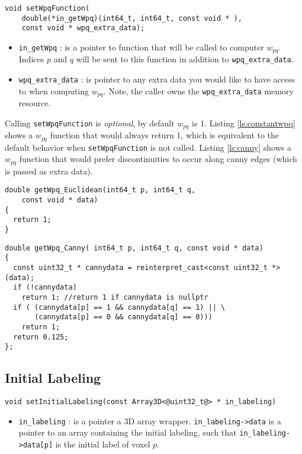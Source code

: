 \documentclass[12pt,letterpaper]{article}
\begin{document}
\begin{lstlisting}
void setWpqFunction(
    double(*in_getWpq)(int64_t, int64_t, const void * ),
    const void * wpq_extra_data);
\end{lstlisting}
\begin{itemize}
\item \lstinline{in_getWpq} : is a pointer to function that will be called to computer $w_{pq}$. Indices $p$ and $q$ will be sent to this function in addition to \lstinline{wpq_extra_data}.
\item \lstinline{wpq_extra_data} : is pointer to any extra data you would like to have access to when computing $w_{pq}.$ Note, the caller owns the \lstinline{wpq_extra_data} memory resource.
\end{itemize}
Calling \lstinline{setWpqFunction} is {\em optional}, by default $w_{pq}$ is 1. Listing \ref{ls:constantwpq} shows a $w_{pq}$ function that would always return 1, which is equivalent to the default behavior when \lstinline{setWpqFunction} is not called. Listing \ref{ls:canny} shows a $w_{pq}$ function that would prefer discontinuities to occur along canny edges (which is passed as extra data).

\begin{lstlisting}[caption=Constant $w_{pq}$,label={ls:constantwpq},backgroundcolor=\color{white},frame=single]
double getWpq_Euclidean(int64_t p, int64_t q,
    const void * data)
{
  return 1;
}
\end{lstlisting}

\begin{lstlisting}[caption=$w_{pq}$ as a function of Canny Edges,label={ls:canny},backgroundcolor=\color{white},frame=single]
double getWpq_Canny( int64_t p, int64_t q, const void * data)
{
  const uint32_t * cannydata = reinterpret_cast<const uint32_t *>(data);
  if (!cannydata)
    return 1; //return 1 if cannydata is nullptr
  if ( (cannydata[p] == 1 && cannydata[q] == 1) || \
       (cannydata[p] == 0 && cannydata[q] == 0)))
    return 1;
  return 0.125;
};
\end{lstlisting}

\subsection{Initial Labeling}
\begin{lstlisting}
void setInitialLabeling(const Array3D<@uint32_t@> * in_labeling)
\end{lstlisting}
\begin{itemize}
\item \lstinline{in_labeling} : is a pointer a 3D array wrapper. \lstinline{in_labeling->data} is a pointer to an array containing the initial labeling, such that \lstinline{in_labeling->data[p]} is the initial label of voxel $p$.
\end{itemize}
\end{document}
